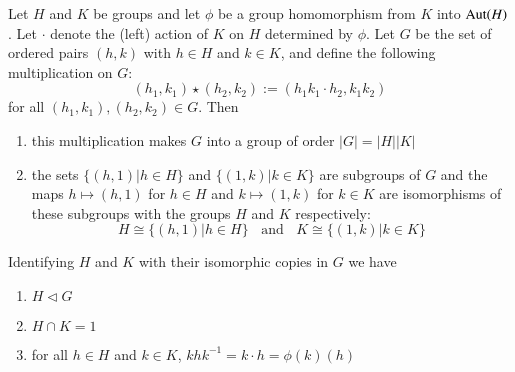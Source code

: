 \documentclass[12pt, a4paper, twoside, openright, titlepage]{book}
\begin{document}
\begin{thm}{}{}
    Let $H$ and $K$ be groups and let $\phi$ be a group homomorphism from $K$ into $\operatorname{Aut}(H)$. Let $\cdot$ denote the (left) action of $K$ on $H$ determined by $\phi$. Let $G$ be the set of ordered pairs $(h,k)$ with $h \in H$ and $k \in K$, and define the following multiplication on $G$:\begin{equation*}
        (h_1,k_1)\star(h_2,k_2) := (h_1k_1\cdot h_2,k_1k_2)
    \end{equation*}
    for all $(h_1,k_1),(h_2,k_2) \in G$. Then \begin{enumerate}
        \item this multiplication makes $G$ into a group of order $|G| = |H||K|$
        \item the sets $\{(h,1)\vert h \in H\}$ and $\{(1,k)\vert k \in K\}$ are subgroups of $G$ and the maps $h\mapsto (h,1)$ for $h \in H$ and $k \mapsto (1,k)$ for $k \in K$ are isomorphisms of these subgroups with the groups $H$ and $K$ respectively: \begin{equation*}
                H\cong \{(h,1)\vert h\in H\}\;\;\text{ and }\;\;K\cong \{(1,k)\vert k\in K\}
        \end{equation*}
    \end{enumerate}
            Identifying $H$ and $K$ with their isomorphic copies in $G$ we have \begin{enumerate}
                \item $H\vartriangleleft G$
                \item $H\cap K = 1$
                \item for all $h \in H$ and $k \in K$, $khk^{-1} = k\cdot h = \phi(k)(h)$
            \end{enumerate}
\end{thm}
\end{document}
